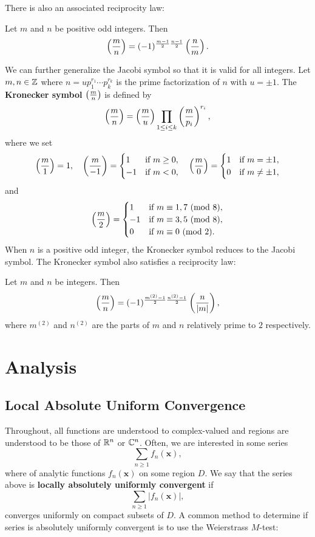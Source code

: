     There is also an associated reciprocity law:
    \begin{proposition}
      Let $m$ and $n$ be positive odd integers. Then
      \[
        \left(\frac{m}{n}\right) = (-1)^{\frac{m-1}{2}\frac{n-1}{2}}\left(\frac{n}{m}\right).
      \]
    \end{proposition}
    We can further generalize the Jacobi symbol so that it is valid for all integers. Let $m,n \in \mathbb{Z}$ where $n = up_{1}^{r_{1}} \cdots p_{k}^{r_{k}}$ is the prime factorization of $n$ with $u = \pm1$. The \textbf{Kronecker symbol} $\textstyle{\left(\frac{m}{n}\right)}$ is defined by
    \[
      \left(\frac{m}{n}\right) = \left(\frac{m}{u}\right)\prod_{1 \le i \le k}\left(\frac{m}{p_{i}}\right)^{r_{i}},
    \]
    where we set
    \[
      \left(\frac{m}{1}\right) = 1, \quad \left(\frac{m}{-1}\right) = \begin{cases} 1 & \text{if $m \ge 0$}, \\ -1 & \text{if $m < 0$}, \end{cases} \quad \left(\frac{m}{0}\right) = \begin{cases} 1 & \text{if $m = \pm 1$}, \\ 0 & \text{if $m \neq \pm 1$}, \end{cases}
    \]
    and
    \[
      \left(\frac{m}{2}\right) = \begin{cases} 1 & \text{if $m \equiv 1,7 \ (\mathrm{mod}\text{ }8)$}, \\ -1 & \text{if $m \equiv 3,5 \ (\mathrm{mod}\text{ }8)$}, \\ 0 & \text{if $m \equiv 0 \ (\mathrm{mod}\text{ }2)$}. \end{cases}
    \]
    When $n$ is a positive odd integer, the Kronecker symbol reduces to the Jacobi symbol. The Kronecker symbol also satisfies a reciprocity law:
    \begin{proposition}
      Let $m$ and $n$ be integers. Then
      \[
        \left(\frac{m}{n}\right) = (-1)^{\frac{m^{(2)}-1}{2}\frac{n^{(2)}-1}{2}}\left(\frac{n}{|m|}\right),
      \]
      where $m^{(2)}$ and $n^{(2)}$ are the parts of $m$ and $n$ relatively prime to $2$ respectively.
    \end{proposition}
\chapter{Analysis}
  \section{Local Absolute Uniform Convergence}
    Throughout, all functions are understood to complex-valued and regions are understood to be those of $\mathbb{R}^{n}$ or $\mathbb{C}^{n}$. Often, we are interested in some series
    \[
      \sum_{n \ge 1}f_{n}(\mathbf{x}),
    \]
    where of analytic functions $f_{n}(\mathbf{x})$ on some region $D$. We say that the series above is \textbf{locally absolutely uniformly convergent} if
    \[
      \sum_{n \ge 1}|f_{n}(\mathbf{x})|,
    \]
    converges uniformly on compact subsets of $D$. A common method to determine if series is absolutely uniformly convergent is to use the Weierstrass $M$-test:

